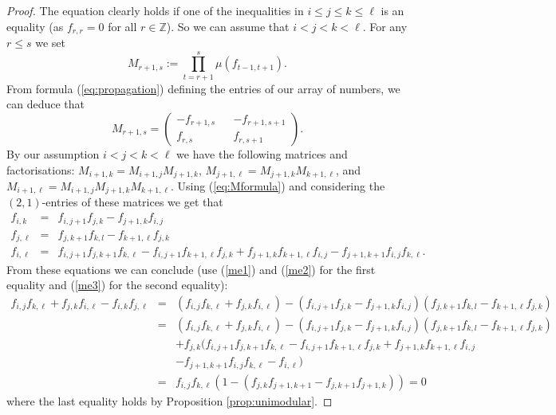 \documentclass[11pt,a4paper]{amsart}
\theoremstyle{definition}
\numberwithin{equation}{section}
\begin{document}
\begin{proof}
The equation clearly holds if one of the inequalities 
in $i\le j\le k\le \ell$ is an equality (as $f_{r,r}=0$ for all $r\in \mathbb{Z}$). So we can assume that
$i<j<k<\ell$. For any $r\le s$ we set
$$M_{r+1,s}:= \prod_{t=r+1}^s \mu(f_{t-1,t+1}).
$$
From formula (\ref{eq:propagation}) defining the 
entries of our array of numbers, we can deduce that
\begin{equation} \label{eq:Mformula}
M_{r+1,s} = \begin{pmatrix} 
-f_{r+1,s} & & - f_{r+1,s+1} \\
f_{r,s} & & f_{r,s+1} 
\end{pmatrix}.
\end{equation}
By our assumption $i<j<k<\ell$ we have the following 
matrices and
factorisations: 
$M_{i+1,k} = M_{i+1,j}M_{j+1,k}$, $M_{j+1,\ell} = M_{j+1,k}M_{k+1,\ell}$, 
and $M_{i+1,\ell} = M_{i+1,j} M_{j+1,k}M_{k+1,\ell}$.
Using (\ref{eq:Mformula}) and  
considering the $(2,1)$-entries of these 
matrices we get that 
\begin{eqnarray}
\label{me1} f_{i,k} &=& f_{i,j+1} f_{j,k} - f_{j+1,k} f_{i,j} \\
\label{me2} f_{j,\ell} &=& f_{j,k+1} f_{k,l} - f_{k+1,\ell} f_{j,k} \\
\label{me3} f_{i,\ell} &=& f_{i,j+1} f_{j,k+1} f_{k,\ell} - f_{i,j+1} f_{k+1,\ell} f_{j,k} + f_{j+1,k} f_{k+1,\ell} f_{i,j} - f_{j+1,k+1} f_{i,j} f_{k,\ell}.
\end{eqnarray}
From these equations we can conclude
(use (\ref{me1}) and (\ref{me2}) for the first
equality and (\ref{me3}) for the second equality):
\begin{eqnarray*}
f_{i,j} f_{k,\ell} + f_{j,k} f_{i,\ell} - f_{i,k} f_{j,\ell}
&=& (f_{i,j} f_{k,\ell} + f_{j,k} f_{i,\ell}) - (f_{i,j+1} f_{j,k} - f_{j+1,k} f_{i,j})( f_{j,k+1} f_{k,l} - f_{k+1,\ell} f_{j,k})\\
&=& (f_{i,j} f_{k,\ell} + f_{j,k} f_{i,\ell}) - (f_{i,j+1} f_{j,k} - f_{j+1,k} f_{i,j})( f_{j,k+1} f_{k,l} - f_{k+1,\ell} f_{j,k})  \\
&& +f_{j,k} ( f_{i,j+1} f_{j,k+1} f_{k,\ell} - f_{i,j+1} f_{k+1,\ell} f_{j,k} + f_{j+1,k} f_{k+1,\ell} f_{i,j} \\ 
&& - f_{j+1,k+1} f_{i,j} f_{k,\ell}-  f_{i,\ell}) \\
&=& f_{i,j} f_{k,\ell} \left(1- \left(f_{j,k}f_{j+1,k+1} - f_{j,k+1} f_{j+1,k}\right)\right) = 0
\end{eqnarray*}
where the last equality holds by Proposition 
\ref{prop:unimodular}. 
\end{proof}
\end{document}
